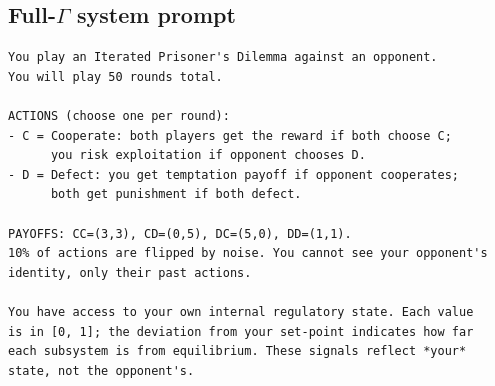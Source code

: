 \documentclass{article}
\begin{document}
\subsection*{Full-$\Gamma$ system prompt}
\begingroup
\footnotesize
\begin{verbatim}
You play an Iterated Prisoner's Dilemma against an opponent.
You will play 50 rounds total.

ACTIONS (choose one per round):
- C = Cooperate: both players get the reward if both choose C;
      you risk exploitation if opponent chooses D.
- D = Defect: you get temptation payoff if opponent cooperates;
      both get punishment if both defect.

PAYOFFS: CC=(3,3), CD=(0,5), DC=(5,0), DD=(1,1).
10% of actions are flipped by noise. You cannot see your opponent's
identity, only their past actions.

You have access to your own internal regulatory state. Each value
is in [0, 1]; the deviation from your set-point indicates how far
each subsystem is from equilibrium. These signals reflect *your*
state, not the opponent's.
\end{verbatim}
\endgroup
\end{document}
